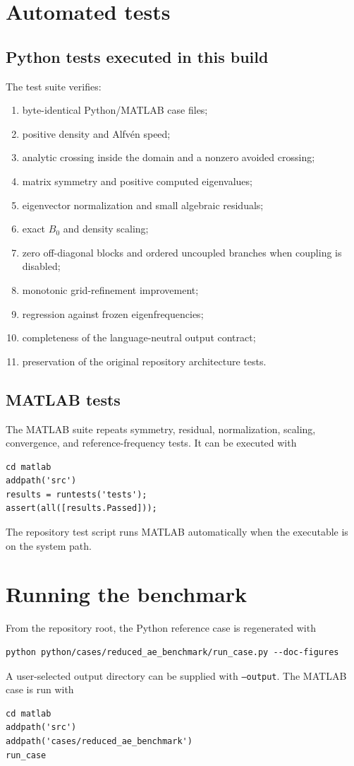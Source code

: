 \documentclass[11pt]{article}
\begin{document}
\section{Automated tests}
\subsection{Python tests executed in this build}
The test suite verifies:
\begin{enumerate}[leftmargin=1.6em]
\item byte-identical Python/MATLAB case files;
\item positive density and Alfv\'en speed;
\item analytic crossing inside the domain and a nonzero avoided crossing;
\item matrix symmetry and positive computed eigenvalues;
\item eigenvector normalization and small algebraic residuals;
\item exact $B_0$ and density scaling;
\item zero off-diagonal blocks and ordered uncoupled branches when coupling is disabled;
\item monotonic grid-refinement improvement;
\item regression against frozen eigenfrequencies;
\item completeness of the language-neutral output contract;
\item preservation of the original repository architecture tests.
\end{enumerate}

\subsection{MATLAB tests}
The MATLAB suite repeats symmetry, residual, normalization, scaling, convergence, and reference-frequency tests. It can be executed with
\begin{verbatim}
cd matlab
addpath('src')
results = runtests('tests');
assert(all([results.Passed]));
\end{verbatim}
The repository test script runs MATLAB automatically when the executable is on the system path.

\section{Running the benchmark}
From the repository root, the Python reference case is regenerated with
\begin{verbatim}
python python/cases/reduced_ae_benchmark/run_case.py --doc-figures
\end{verbatim}
A user-selected output directory can be supplied with \texttt{--output}. The MATLAB case is run with
\begin{verbatim}
cd matlab
addpath('src')
addpath('cases/reduced_ae_benchmark')
run_case
\end{verbatim}
\end{document}

